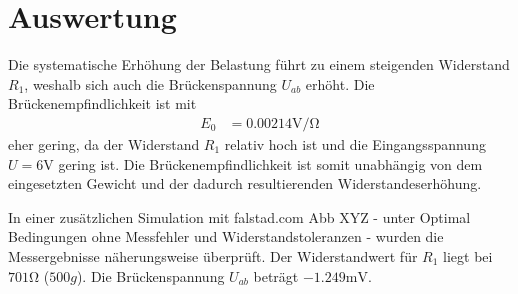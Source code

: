 \section[Auswertung]{Auswertung}

Die systematische Erhöhung der Belastung führt zu einem steigenden Widerstand \( R_1 \),
weshalb sich auch die Brückenspannung \( U_{ab} \) erhöht.
Die Brückenempfindlichkeit ist mit
\begin{align}
    E_0 &= 0.00214 \si{\volt\per\ohm}
\end{align}
eher gering, da der Widerstand \( R_1 \) relativ hoch ist
und die Eingangsspannung \( U = 6 \si{\volt} \) gering ist.
Die Brückenempfindlichkeit ist somit unabhängig von dem eingesetzten Gewicht
und der dadurch resultierenden Widerstandeserhöhung.

In einer zusätzlichen Simulation mit falstad.com Abb XYZ
- unter Optimal Bedingungen ohne Messfehler und Widerstandstoleranzen -
wurden die Messergebnisse näherungsweise überprüft.
Der Widerstandwert für \( R_1 \) liegt bei \( 701 \si{\ohm} \) (\( 500g \)).
Die Brückenspannung \( U_{ab} \) beträgt \( -1.249 \si{\milli\volt} \).